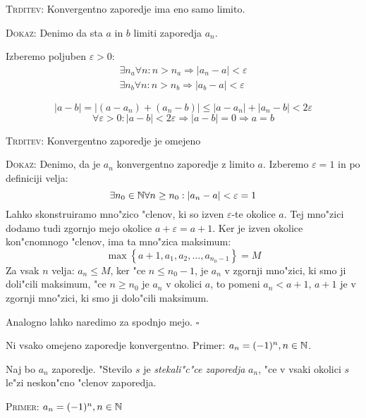 \textsc{Trditev:} Konvergentno zaporedje ima eno samo limito.

\textsc{Dokaz:} Denimo da sta $a$ in $b$ limiti zaporedja $a_n$.
\begin{multicols}{2}
Izberemo poljuben $\varepsilon > 0:$
\columnbreak
\begin{gather*}
	\exists n_a \forall n: n > n_a \Rightarrow |a_n - a| < \varepsilon \\
	\exists n_b \forall n: n > n_b \Rightarrow |a_b - a| < \varepsilon
\end{gather*}
\end{multicols}
\begin{equation*}
|a - b| = |(a-a_n) + (a_n-b)| \leq |a-a_n| + |a_n-b| < 2\varepsilon
\end{equation*}
\begin{equation*}
\forall \varepsilon > 0: |a-b| < 2\varepsilon \Rightarrow |a-b| = 0 \Rightarrow a = b
\end{equation*}

\textsc{Trditev:} Konvergentno zaporedje je omejeno

\textsc{Dokaz:} Denimo, da je $a_n$ konvergentno zaporedje z limito $a$. Izberemo $\varepsilon = 1$ in po definiciji velja:
\begin{equation*}
\exists n_0 \in \mathbb{N} \forall n \geq n_0: |a_n - a| < \varepsilon = 1
\end{equation*}
Lahko skonstruiramo mno"zico "clenov, ki so izven $\varepsilon$-te okolice $a$. Tej mno"zici dodamo tudi zgornjo mejo okolice $a + \varepsilon = a + 1$. Ker je izven okolice kon"cnomnogo "clenov, ima ta mno"zica maksimum:
\begin{equation*}
\max \left\{a+1, a_1, a_2, \ldots, a_{n_0-1} \right\} = M
\end{equation*}
Za vsak $n$ velja: $a_n \leq M$, ker "ce $n \leq n_0 - 1$, je $a_n$ v zgornji mno"zici, ki smo ji doli"cili maksimum, "ce $n \geq n_0$ je $a_n$ v okolici $a$, to pomeni $a_n < a + 1$, $a+1$ je v zgornji mno"zici, ki smo ji dolo"cili maksimum.

Analogno lahko naredimo za spodnjo mejo. \hfill $\square$

Ni vsako omejeno zaporedje konvergentno. Primer: $a_n = (-1)^n, n \in \mathbb{N}$.

 Naj bo $a_n$ zaporedje. "Stevilo $s$ je \emph{stekali"c"ce zaporedja} $a_n$, "ce v vsaki okolici $s$ le"zi neskon"cno "clenov zaporedja.

\textsc{Primer:} $a_n = (-1)^n, n \in \mathbb{N}$


